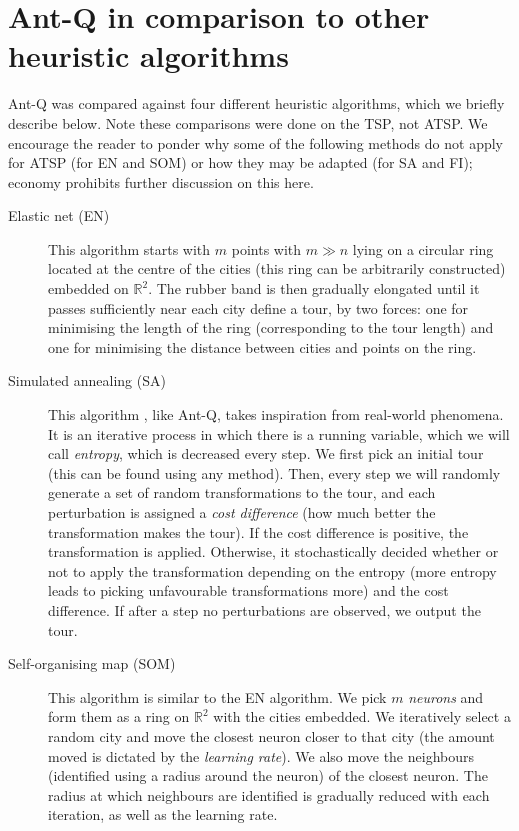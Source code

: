 \section{Ant-Q in comparison to other heuristic algorithms}

Ant-Q was compared against four different heuristic algorithms, which we briefly describe below. Note these comparisons were done on the TSP, not ATSP. We encourage the reader to ponder why some of the following methods do not apply for ATSP (for EN and SOM) or how they may be adapted (for SA and FI); economy prohibits further discussion on this here.

\begin{description}
    \item[Elastic net (EN)] This algorithm \cite{durbin1987analogue} starts with $m$ points with $m \gg n$ lying on a circular ring located at the centre of the cities  (this ring can be arbitrarily constructed) embedded on $\mathbb R^2$. The rubber band is then gradually elongated until it passes sufficiently near each city define a tour, by two forces: one for minimising the length of the ring (corresponding to the tour length) and one for minimising the distance between cities and points on the ring.
    \item[Simulated annealing (SA)] This algorithm \cite{van1987simulated}, like Ant-Q, takes inspiration from real-world phenomena. It is an iterative process in which there is a running variable, which we will call \emph{entropy}, which is decreased every step. We first pick an initial tour (this can be found using any method). Then, every step we will randomly generate a set of random transformations to the tour, and each perturbation is assigned a \emph{cost difference} (how much better the transformation makes the tour). If the cost difference is positive, the transformation is applied. Otherwise, it stochastically decided whether or not to apply the transformation depending on the entropy (more entropy leads to picking unfavourable transformations more) and the cost difference. If after a step no perturbations are observed, we output the tour. 
    \item[Self-organising map (SOM)] This algorithm \cite{kohonen1990self} is similar to the EN algorithm. We pick $m$ \emph{neurons} and form them as a ring on $\mathbb R^2$ with the cities embedded. We iteratively select a random city and move the closest neuron closer to that city (the amount moved is dictated by the \emph{learning rate}). We also move the neighbours (identified using a radius around the neuron) of the closest neuron. The radius at which neighbours are identified is gradually reduced with each iteration, as well as the learning rate. 

\end{description}
